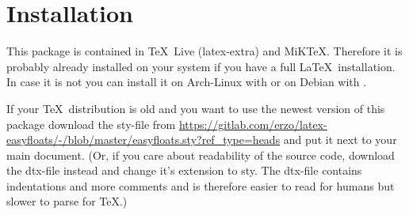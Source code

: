 
\section{Installation}
\label{installation}

This package is contained in \TeX~Live (latex-extra) and MiK\TeX.
Therefore it is probably already installed on your system if you have a full \LaTeX\ installation.
In case it is not you can install it
on Arch-Linux with 
or on Debian with .

If your \TeX\ distribution is old and you want to use the newest version of this package
download the sty-file from \url{https://gitlab.com/erzo/latex-easyfloats/-/blob/master/easyfloats.sty?ref_type=heads}
and put it next to your main document.
(Or, if you care about readability of the source code, download the dtx-file instead and change it's extension to sty.
 The dtx-file contains indentations and more comments and is therefore easier to read for humans but slower to parse for \TeX.)
